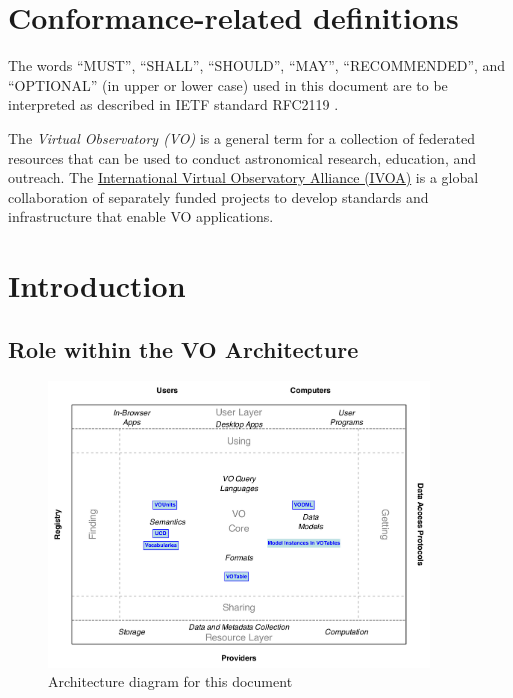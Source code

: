 \documentclass[11pt,a4paper]{ivoa}
\begin{document}
\section*{Conformance-related definitions}

The words ``MUST'', ``SHALL'', ``SHOULD'', ``MAY'', ``RECOMMENDED'', and
``OPTIONAL'' (in upper or lower case) used in this document are to be
interpreted as described in IETF standard RFC2119 \citep{std:RFC2119}.

The \emph{Virtual Observatory (VO)} is a
general term for a collection of federated resources that can be used
to conduct astronomical research, education, and outreach.
The \href{http://www.ivoa.net}{International
Virtual Observatory Alliance (IVOA)} is a global
collaboration of separately funded projects to develop standards and
infrastructure that enable VO applications.

\pagebreak
\section{Introduction}



\subsection{Role within the VO Architecture}

\begin{figure}[h]
\centering


\includegraphics[width=0.9\textwidth]{role_diagram.pdf}
\caption{Architecture diagram for this document}
\label{fig:archdiag}
\end{figure}
\end{document}
